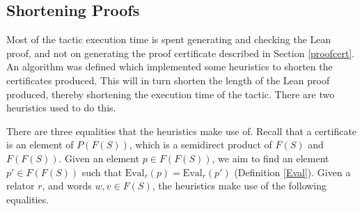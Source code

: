 \documentclass[12pt]{article} %
\theoremstyle{definition}
\theoremstyle{definition}
\theoremstyle{definition}
\theoremstyle{definition}
\begin{document}





\subsection{Shortening Proofs}\label{golfsec}

Most of the tactic execution time is spent generating and checking the Lean proof,
and not on generating the proof certificate described in Section \ref{proofcert}.
An algorithm was defined which implemented some heuristics to shorten the certificates
produced. This will in turn shorten the length of the Lean proof
produced, thereby shortening the execution time of the tactic.
There are two heuristics used to do this.

There are three equalities that the heuristics make use of. Recall that
a certificate is an element of $P(F(S))$, which is a semidirect product of $F(S)$
and $F(F(S))$. Given an element $p \in F(F(S))$, we aim to find an element
$p' \in F(F(S))$ such that $\text{Eval}_r(p) = \text{Eval}_r(p')$ (Definition \ref{Eval}).
Given a relator $r$, and words $w, v \in F(S)$, the heuristics make use of the following equalities.
\end{document}

